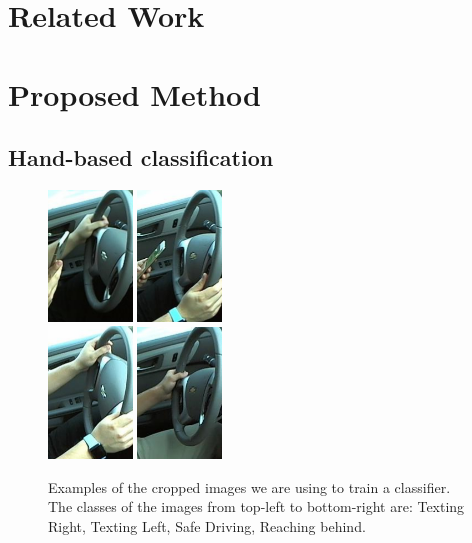 \documentclass[10pt,twocolumn,letterpaper]{article}
\begin{document}
\section{Related Work}



\section{Proposed Method}

\subsection{Hand-based classification}
\begin{figure}[h]
	\centering
	\includegraphics[width=0.2\textwidth]{handpose_example_1_cut}\hspace{0.01\textwidth}
	\includegraphics[width=0.2\textwidth]{handpose_example_2_cut}\\ \vspace{0.01\textwidth}
	\includegraphics[width=0.2\textwidth]{handpose_example_3_cut}\hspace{0.01\textwidth}
	\includegraphics[width=0.2\textwidth]{handpose_example_4_cut}
	\caption{Examples of the cropped images we are using to train a classifier. The classes of the images from top-left to bottom-right are: Texting Right, Texting Left, Safe Driving, Reaching behind.}
	\label{hand_estimation_example}
\end{figure}
\end{document}
